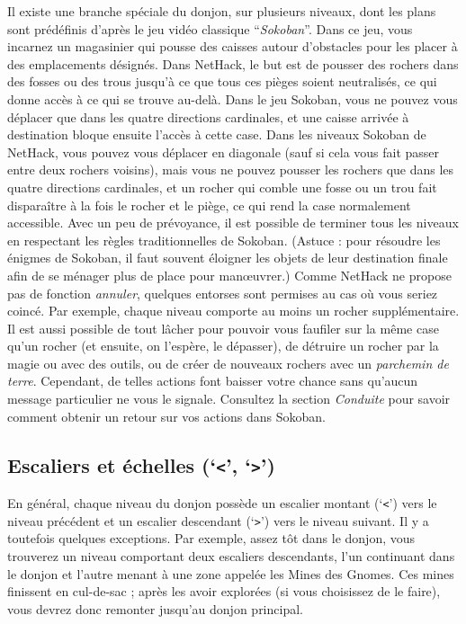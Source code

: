 \documentclass[titlepage]{article}
\begin{document}
Il existe une branche spéciale du donjon, sur plusieurs niveaux, dont les plans
sont prédéfinis d'après le jeu vidéo classique ``\textit{Sokoban}''.
Dans ce jeu, vous incarnez un magasinier qui pousse des caisses autour
d'obstacles pour les placer à des emplacements désignés.
Dans NetHack, le but est de pousser des rochers dans des fosses ou des trous
jusqu'à ce que tous ces pièges soient neutralisés, ce qui donne accès à ce qui
se trouve au-delà.
Dans le jeu Sokoban, vous ne pouvez vous déplacer que dans les quatre directions
cardinales, et une caisse arrivée à destination bloque ensuite l'accès
à cette case.
Dans les niveaux Sokoban de NetHack, vous pouvez vous déplacer en diagonale (sauf
si cela vous fait passer entre deux rochers voisins), mais vous ne pouvez
pousser les rochers que dans les quatre directions cardinales, et un rocher qui
comble une fosse ou un trou fait disparaître à la fois le rocher et le piège,
ce qui rend la case normalement accessible.
Avec un peu de prévoyance, il est possible de terminer tous les niveaux
en respectant les règles traditionnelles de Sokoban.
(Astuce : pour résoudre les énigmes de Sokoban, il faut souvent éloigner les objets
de leur destination finale afin de se ménager plus de place pour manœuvrer.)
Comme NetHack ne propose pas de fonction \textit{annuler}, quelques entorses
sont permises au cas où vous seriez coincé.
Par exemple, chaque niveau comporte au moins un rocher supplémentaire.
Il est aussi possible de tout lâcher pour pouvoir vous faufiler
sur la même case qu'un rocher (et ensuite, on l'espère, le dépasser),
de détruire un rocher par la magie ou avec des outils, ou de créer de nouveaux
rochers avec un \textit{parchemin de terre}.
Cependant, de telles actions font baisser votre chance sans qu'aucun message
particulier ne vous le signale.
Consultez la section \textit{Conduite} pour savoir comment obtenir un retour sur
vos actions dans Sokoban.

\subsection*{Escaliers et échelles (`\texttt{<}', `\texttt{>}')}

En général, chaque niveau du donjon possède un escalier montant
(`\texttt{<}') vers le niveau précédent et un escalier descendant (`\texttt{>}')
vers le niveau
suivant.  Il y a toutefois quelques exceptions.  Par exemple, assez tôt
dans le donjon, vous trouverez un niveau comportant deux escaliers descendants,
l'un continuant dans le donjon et l'autre menant à une zone
appelée les Mines des Gnomes.  Ces mines finissent en cul-de-sac ;
après les avoir explorées (si vous choisissez de le faire), vous devrez donc
remonter jusqu'au donjon principal.
\end{document}
